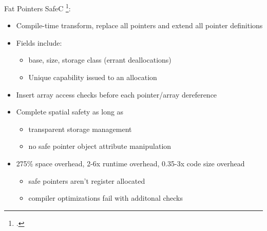 \documentclass[aspectratio=169]{beamer}
\begin{document}
\begin{frame}{Fat Pointers}
SafeC \footcite{austin_efficient_1994}:
  \begin{itemize}
     \item Compile-time transform, replace all pointers and extend all pointer definitions
     \item Fields include:
          \begin{itemize}
             \item base, size, storage class (errant deallocations)
             \item Unique capability issued to an allocation
          \end{itemize}
     \item Insert array access checks before each pointer/array dereference
     \item Complete spatial safety as long as
         \begin{itemize}
            \item transparent storage management
            \item no safe pointer object attribute manipulation
         \end{itemize}
     \item 275\% space overhead, 2-6x runtime overhead, 0.35-3x code size overhead
         \begin{itemize}
            \item safe pointers aren't register allocated
            \item compiler optimizations fail with additonal checks
         \end{itemize}
  \end{itemize}
\vspace{0.2in}
\end{frame}
\end{document}
